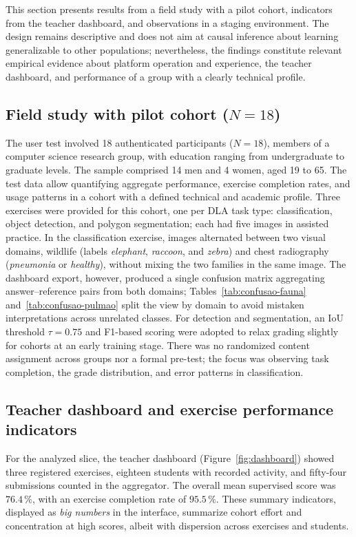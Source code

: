 \documentclass[runningheads]{llncs}
\begin{document}
This section presents results from a field study with a pilot cohort, indicators from the teacher dashboard, and observations in a staging environment. The design remains descriptive and does not aim at causal inference about learning generalizable to other populations; nevertheless, the findings constitute relevant empirical evidence about platform operation and experience, the teacher dashboard, and performance of a group with a clearly technical profile.

\subsection{Field study with pilot cohort ($N=18$)}

The user test involved 18 authenticated participants ($N=18$), members of a computer science research group, with education ranging from undergraduate to graduate levels. The sample comprised 14 men and 4 women, aged 19 to 65. The test data allow quantifying aggregate performance, exercise completion rates, and usage patterns in a cohort with a defined technical and academic profile. Three exercises were provided for this cohort, one per DLA task type: classification, object detection, and polygon segmentation; each had five images in assisted practice. In the classification exercise, images alternated between two visual domains, wildlife (labels \emph{elephant}, \emph{raccoon}, and \emph{zebra}) and chest radiography (\emph{pneumonia} or \emph{healthy}), without mixing the two families in the same image. The dashboard export, however, produced a single confusion matrix aggregating answer--reference pairs from both domains; Tables~\ref{tab:confusao-fauna} and~\ref{tab:confusao-pulmao} split the view by domain to avoid mistaken interpretations across unrelated classes. For detection and segmentation, an IoU threshold $\tau = 0.75$ and F1-based scoring were adopted to relax grading slightly for cohorts at an early training stage. There was no randomized content assignment across groups nor a formal pre-test; the focus was observing task completion, the grade distribution, and error patterns in classification.

\subsection{Teacher dashboard and exercise performance indicators}

For the analyzed slice, the teacher dashboard (Figure~\ref{fig:dashboard}) showed three registered exercises, eighteen students with recorded activity, and fifty-four submissions counted in the aggregator. The overall mean supervised score was $76.4\,\%$, with an exercise completion rate of $95.5\,\%$. These summary indicators, displayed as \textit{big numbers} in the interface, summarize cohort effort and concentration at high scores, albeit with dispersion across exercises and students.
\end{document}
